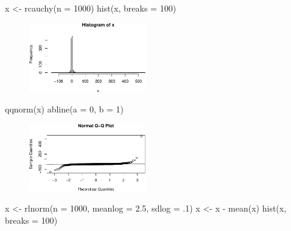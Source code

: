 \documentclass[
  letterpaper,
  DIV=11,
  numbers=noendperiod]{scrreport}
\newenvironment{Shaded}{\begin{snugshade}}{\end{snugshade}}
\newcommand{\AttributeTok}[1]{\textcolor[rgb]{0.40,0.45,0.13}{#1}}
\newcommand{\DecValTok}[1]{\textcolor[rgb]{0.68,0.00,0.00}{#1}}
\newcommand{\FloatTok}[1]{\textcolor[rgb]{0.68,0.00,0.00}{#1}}
\newcommand{\FunctionTok}[1]{\textcolor[rgb]{0.28,0.35,0.67}{#1}}
\newcommand{\NormalTok}[1]{\textcolor[rgb]{0.00,0.23,0.31}{#1}}
\newcommand{\OtherTok}[1]{\textcolor[rgb]{0.00,0.23,0.31}{#1}}
\newcommand{\SpecialCharTok}[1]{\textcolor[rgb]{0.37,0.37,0.37}{#1}}
\begin{document}
\begin{Shaded}
\begin{Highlighting}[]
\NormalTok{x }\OtherTok{\textless{}{-}} \FunctionTok{rcauchy}\NormalTok{(}\AttributeTok{n =} \DecValTok{1000}\NormalTok{)}
\FunctionTok{hist}\NormalTok{(x, }\AttributeTok{breaks =} \DecValTok{100}\NormalTok{)}
\end{Highlighting}
\end{Shaded}

\begin{figure}[H]

{\centering \includegraphics[width=0.45\textwidth,height=\textheight]{week4/week4_files/figure-pdf/unnamed-chunk-3-3.pdf}

}

\end{figure}

\begin{Shaded}
\begin{Highlighting}[]
\FunctionTok{qqnorm}\NormalTok{(x)}
\FunctionTok{abline}\NormalTok{(}\AttributeTok{a =} \DecValTok{0}\NormalTok{, }\AttributeTok{b =} \DecValTok{1}\NormalTok{)}
\end{Highlighting}
\end{Shaded}

\begin{figure}[H]

{\centering \includegraphics[width=0.45\textwidth,height=\textheight]{week4/week4_files/figure-pdf/unnamed-chunk-3-4.pdf}

}

\end{figure}

\begin{Shaded}
\begin{Highlighting}[]
\NormalTok{x }\OtherTok{\textless{}{-}} \FunctionTok{rlnorm}\NormalTok{(}\AttributeTok{n =} \DecValTok{1000}\NormalTok{, }\AttributeTok{meanlog =} \FloatTok{2.5}\NormalTok{, }\AttributeTok{sdlog =}\NormalTok{ .}\DecValTok{1}\NormalTok{)}
\NormalTok{x }\OtherTok{\textless{}{-}}\NormalTok{ x }\SpecialCharTok{{-}} \FunctionTok{mean}\NormalTok{(x)}
\FunctionTok{hist}\NormalTok{(x, }\AttributeTok{breaks =} \DecValTok{100}\NormalTok{)}
\end{Highlighting}
\end{Shaded}
\end{document}

